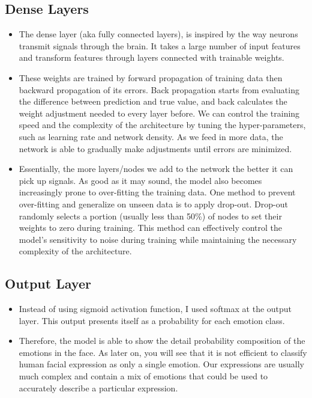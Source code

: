 \subsection{Dense Layers}
\begin{itemize}
	\item The dense layer (aka fully connected layers), is inspired by the way neurons transmit signals through the brain. It takes a large number of input features and transform features through layers connected with trainable weights.
	\item These weights are trained by forward propagation of training data then backward propagation of its errors. Back propagation starts from evaluating the difference between prediction and true value, and back calculates the weight adjustment needed to every layer before. We can control the training speed and the complexity of the architecture by tuning the hyper-parameters, such as learning rate and network density. As we feed in more data, the network is able to gradually make adjustments until errors are minimized.
	\item Essentially, the more layers/nodes we add to the network the better it can pick up signals. As good as it may sound, the model also becomes increasingly prone to over-fitting the training data. One method to prevent over-fitting and generalize on unseen data is to apply drop-out. Drop-out randomly selects a portion (usually less than 50\%) of nodes to set their weights to zero during training. This method can effectively control the model's sensitivity to noise during training while maintaining the necessary complexity of the architecture.
\end{itemize}

\subsection{Output Layer}
\begin{itemize}
	\item Instead of using sigmoid activation function, I used softmax at the output layer. This output presents itself as a probability for each emotion class.
	\item Therefore, the model is able to show the detail probability composition of the emotions in the face. As later on, you will see that it is not efficient to classify human facial expression as only a single emotion. Our expressions are usually much complex and contain a mix of emotions that could be used to accurately describe a particular expression.
\end{itemize}

